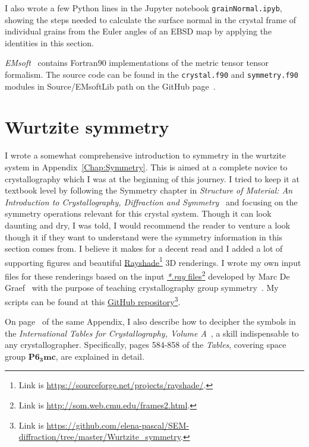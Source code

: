 I also wrote a few Python lines in the Jupyter notebook \texttt{grainNormal.ipyb}, showing the steps needed to calculate the surface normal in the crystal frame of individual grains from the Euler angles of an EBSD map by applying the identities in this section. 
 
\emph{EMsoft}~\cite{EMsoftpaper} contains Fortran90 implementations of the metric tensor tensor formalism. The source code can be found in the \texttt{crystal.f90} and \texttt{symmetry.f90} modules in Source/EMsoftLib path on the GitHub page~\cite{EMsoft}.


\section{Wurtzite symmetry}
\label{sec:Wsymmetry}
I wrote a somewhat comprehensive introduction to symmetry in the wurtzite system in Appendix~\ref{Chap:Symmetry}. This is aimed at a complete novice to crystallography which I was at the beginning of this journey. I tried to keep it at textbook level by following the Symmetry chapter in \textit{Structure of Material: An Introduction to Crystallography, Diffraction and Symmetry}~\cite{SoM} and focusing on the symmetry operations relevant for this crystal system. Though it can look daunting and dry, I was told, I would recommend the reader to venture a look though it if they want to understand were the symmetry information in this section comes from. I believe it makes for a decent read and I added a lot of supporting figures and beautiful  \href{https://sourceforge.net/projects/rayshade/}{Rayshade}\footnote{ Link is \href{https://sourceforge.net/projects/rayshade/}{https://sourceforge.net/projects/rayshade/}.} 3D renderings. I wrote my own input files for these renderings based on the input  \href{http://som.web.cmu.edu/frames2.html}{\emph{*.ray} files}\footnote{ Link is \href{http://som.web.cmu.edu/frames2.html.}{http://som.web.cmu.edu/frames2.html}.} developed by Marc De Graef~\cite{DeGraef98} with the purpose of teaching crystallography group symmetry~\cite{teachingPointGroup}. My scripts can be found at this \href{https://github.com/elena-pascal/SEM-diffraction/tree/master/Wurtzite_symmetry/}{GitHub repository}\footnote{ Link is \href{https://github.com/elena-pascal/SEM-diffraction/tree/master/Wurtzite_symmetry}{https://github.com/elena-pascal/SEM-diffraction/tree/master/Wurtzite\_symmetry}.}. 

On page~\pageref{chap:int} of the same Appendix, I also describe how to decipher the symbols in the \textit{ International Tables for Crystallography, Volume A}~\cite{IntTableCrysA}, a skill indispensable to any crystallographer. Specifically, pages 584-858 of the \textit{Tables}, covering space group $\mathbf{P6_3mc}$, are explained in detail.

